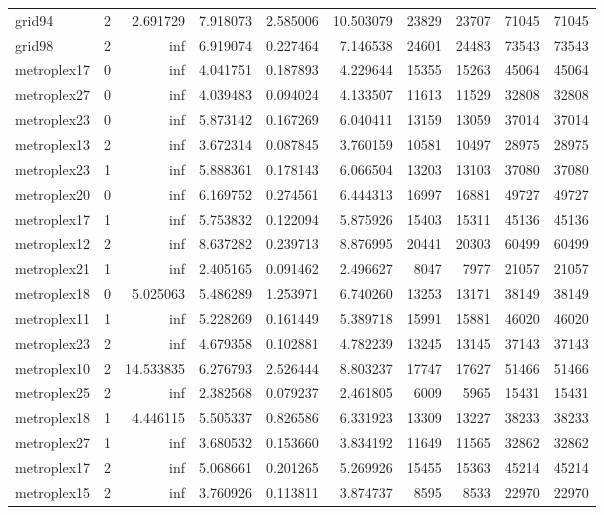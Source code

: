 \begin{longtable}{|l|r|r|r|r|r|r|r|r|r|}
grid94 & 2 & 2.691729 & 7.918073 & 2.585006 & 10.503079 & 23829 & 23707 & 71045 & 71045 \\
grid98 & 2 & inf & 6.919074 & 0.227464 & 7.146538 & 24601 & 24483 & 73543 & 73543 \\
metroplex17 & 0 & inf & 4.041751 & 0.187893 & 4.229644 & 15355 & 15263 & 45064 & 45064 \\
metroplex27 & 0 & inf & 4.039483 & 0.094024 & 4.133507 & 11613 & 11529 & 32808 & 32808 \\
metroplex23 & 0 & inf & 5.873142 & 0.167269 & 6.040411 & 13159 & 13059 & 37014 & 37014 \\
metroplex13 & 2 & inf & 3.672314 & 0.087845 & 3.760159 & 10581 & 10497 & 28975 & 28975 \\
metroplex23 & 1 & inf & 5.888361 & 0.178143 & 6.066504 & 13203 & 13103 & 37080 & 37080 \\
metroplex20 & 0 & inf & 6.169752 & 0.274561 & 6.444313 & 16997 & 16881 & 49727 & 49727 \\
metroplex17 & 1 & inf & 5.753832 & 0.122094 & 5.875926 & 15403 & 15311 & 45136 & 45136 \\
metroplex12 & 2 & inf & 8.637282 & 0.239713 & 8.876995 & 20441 & 20303 & 60499 & 60499 \\
metroplex21 & 1 & inf & 2.405165 & 0.091462 & 2.496627 & 8047 & 7977 & 21057 & 21057 \\
metroplex18 & 0 & 5.025063 & 5.486289 & 1.253971 & 6.740260 & 13253 & 13171 & 38149 & 38149 \\
metroplex11 & 1 & inf & 5.228269 & 0.161449 & 5.389718 & 15991 & 15881 & 46020 & 46020 \\
metroplex23 & 2 & inf & 4.679358 & 0.102881 & 4.782239 & 13245 & 13145 & 37143 & 37143 \\
metroplex10 & 2 & 14.533835 & 6.276793 & 2.526444 & 8.803237 & 17747 & 17627 & 51466 & 51466 \\
metroplex25 & 2 & inf & 2.382568 & 0.079237 & 2.461805 & 6009 & 5965 & 15431 & 15431 \\
metroplex18 & 1 & 4.446115 & 5.505337 & 0.826586 & 6.331923 & 13309 & 13227 & 38233 & 38233 \\
metroplex27 & 1 & inf & 3.680532 & 0.153660 & 3.834192 & 11649 & 11565 & 32862 & 32862 \\
metroplex17 & 2 & inf & 5.068661 & 0.201265 & 5.269926 & 15455 & 15363 & 45214 & 45214 \\
metroplex15 & 2 & inf & 3.760926 & 0.113811 & 3.874737 & 8595 & 8533 & 22970 & 22970 \\

\end{longtable}
